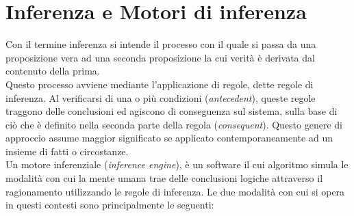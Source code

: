 \section{Inferenza e Motori di inferenza}

 \label{App:AppendiceInference}
 Con  il termine inferenza si intende il processo con il quale si passa da una proposizione vera ad una seconda proposizione la cui verità è derivata dal contenuto della prima. \\
 Questo processo avviene mediante l'applicazione di regole, dette regole di inferenza. Al verificarsi di una o più condizioni (\textit{antecedent}), queste regole traggono delle conclusioni ed agiscono di conseguenza sul sistema, sulla base di ciò che è definito nella seconda parte della regola (\textit{consequent}).
 Questo genere di approccio assume maggior significato se applicato contemporaneamente ad un insieme di fatti o circostanze. \\
 Un motore inferenziale (\textit{inference engine}), è un software il cui algoritmo simula le modalità con cui la mente umana trae delle conclusioni logiche attraverso il ragionamento utilizzando le regole di inferenza.
 Le due modalità con cui si opera in questi contesti sono principalmente le seguenti:

